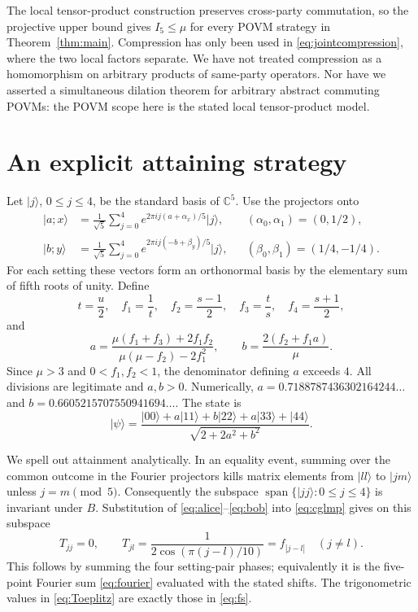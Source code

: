 \documentclass[11pt,a4paper]{article}
\numberwithin{equation}{section}
\theoremstyle{remark}\newtheorem{remark}[theorem]{Remark}
\newcommand{\C}{\mathbb C}
\newcommand{\ket}[1]{\lvert #1\rangle}
\begin{document}
The local tensor-product construction preserves cross-party commutation, so
the projective upper bound gives $I_5\leq\mu$ for every POVM strategy in
Theorem~\ref{thm:main}. Compression has only been used in
\eqref{eq:jointcompression}, where the two local factors separate. We have
not treated compression as a homomorphism on arbitrary products of
same-party operators. Nor have we asserted a simultaneous dilation theorem
for arbitrary abstract commuting POVMs: the POVM scope here is the stated
local tensor-product model.

\section{An explicit attaining strategy}\label{sec:attainment}
Let $\ket j$, $0\leq j\leq4$, be the standard basis of $\C^5$.
Use the projectors onto
\begin{align}
 \ket{a;x}&=\frac1{\sqrt5}\sum_{j=0}^4
 e^{2\pi i j(a+\alpha_x)/5}\ket j,
 &&(\alpha_0,\alpha_1)=(0,1/2),\label{eq:alice}\\
 \ket{b;y}&=\frac1{\sqrt5}\sum_{j=0}^4
 e^{2\pi i j(-b+\beta_y)/5}\ket j,
 &&(\beta_0,\beta_1)=(1/4,-1/4).\label{eq:bob}
\end{align}
For each setting these vectors form an orthonormal basis by the elementary
sum of fifth roots of unity. Define
\begin{equation}\label{eq:fs}
 t=\frac u2,\quad f_1=\frac1t,\quad f_2=\frac{s-1}2,\quad
 f_3=\frac ts,\quad f_4=\frac{s+1}2,
\end{equation}
and
\begin{equation}\label{eq:ab}
 a=\frac{\mu(f_1+f_3)+2f_1f_2}
          {\mu(\mu-f_2)-2f_1^2},\qquad
 b=\frac{2(f_2+f_1a)}\mu.
\end{equation}
Since $\mu>3$ and $0<f_1,f_2<1$, the denominator defining $a$ exceeds $4$.
All divisions are legitimate and $a,b>0$. Numerically,
$a=0.7188787436302164244\ldots$ and
$b=0.6605215707550941694\ldots$.
The state is
\begin{equation}\label{eq:state}
 \ket\psi=\frac{\ket{00}+a\ket{11}+b\ket{22}+a\ket{33}+\ket{44}}
                    {\sqrt{2+2a^2+b^2}}.
\end{equation}

We spell out attainment analytically. In an equality event, summing over
the common outcome in the Fourier projectors kills matrix elements from
$\ket{ll}$ to $\ket{jm}$ unless $j=m\pmod5$. Consequently the subspace
$\operatorname{span}\{\ket{jj}:0\leq j\leq4\}$ is invariant under $B$.
Substitution of \eqref{eq:alice}--\eqref{eq:bob} into
\eqref{eq:cglmp} gives on this subspace
\begin{equation}\label{eq:Toeplitz}
 T_{jj}=0,\qquad
 T_{jl}=\frac1{2\cos(\pi(j-l)/10)}=f_{|j-l|}\quad(j\ne l).
\end{equation}
This follows by summing the four setting-pair phases; equivalently it is
the five-point Fourier sum \eqref{eq:fourier} evaluated with the stated
shifts. The trigonometric values in \eqref{eq:Toeplitz} are exactly those
in \eqref{eq:fs}.
\end{document}
